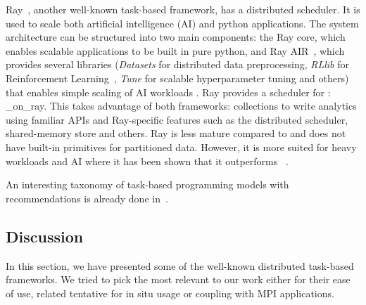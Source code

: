 Ray~\cite{222605_ray}, another well-known task-based framework, has a distributed scheduler.
It is used to scale both artificial intelligence (AI) and python applications. The system architecture can be structured into two main components: the Ray core, which enables scalable applications to be built in pure python, and Ray AIR~\cite{noauthor_ray_AIR_nodate}, which provides several libraries (\textit{Datasets} for distributed data preprocessing, \textit{RLlib} for Reinforcement Learning~\cite{liang2018rllib}, \textit{Tune} for scalable hyperparameter tuning\cite{liaw2018tune} and others) that enables simple scaling of AI workloads \cite{noauthor_ray_nodate}.   
Ray provides a scheduler for \dask: \dask\_on\_ray\cite{noauthor_using_nodate}. This takes advantage of both frameworks: \dask collections to write analytics using familiar APIs and Ray-specific features such as the distributed scheduler, shared-memory store and others.  
Ray is less mature compared to \dask and does not have built-in primitives for partitioned data. However, it is more suited for heavy workloads and AI where it has been shown that it outperforms \dask~\cite{puurula_benchmarking_2019}.

An interesting taxonomy of task-based programming models with recommendations is already done in~\cite{gurhe2021}. 

\subsection{Discussion}\label{discussionTaskBased}
In this section, we have presented some of the well-known distributed task-based frameworks. We tried to pick the most relevant to our work either for their ease of use, related tentative for in situ usage or coupling with MPI applications. 

